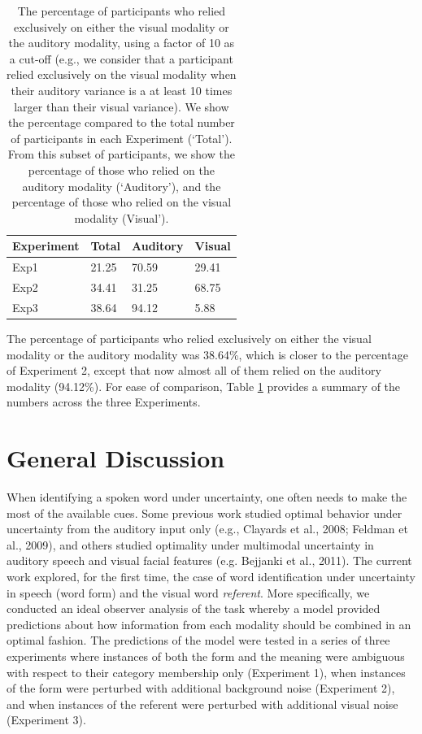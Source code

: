 \documentclass[english,floatsintext,man]{apa6}
\theoremstyle{definition}
\theoremstyle{definition}
\theoremstyle{definition}
\theoremstyle{remark}
\begin{document}
\begin{table}[tbp]
\begin{center}
\begin{threeparttable}
\caption{\label{tab:exclusive}The percentage of participants who relied exclusively on either the visual modality or the auditory modality, using a factor of 10 as a cut-off (e.g., we consider that a participant relied exclusively on the visual modality when their auditory variance is a at least 10 times larger than their visual variance). We show the percentage compared to the total number of participants in each Experiment (`Total'). From this subset of participants, we show the percentage of those who relied on the  auditory modality (`Auditory'), and the percentage of those who relied on the visual  modality (Visual').}
\begin{tabular}{llll}
\toprule
Experiment & \multicolumn{1}{c}{Total} & \multicolumn{1}{c}{Auditory} & \multicolumn{1}{c}{Visual}\\
\midrule
Exp1 & 21.25 & 70.59 & 29.41\\
Exp2 & 34.41 & 31.25 & 68.75\\
Exp3 & 38.64 & 94.12 & 5.88\\
\bottomrule
\end{tabular}
\end{threeparttable}
\end{center}
\end{table}

The percentage of participants who relied exclusively on either the
visual modality or the auditory modality was 38.64\%, which is closer to
the percentage of Experiment 2, except that now almost all of them
relied on the auditory modality (94.12\%). For ease of comparison, Table
\ref{tab:exclusive} provides a summary of the numbers across the three
Experiments.

\section{General Discussion}\label{general-discussion}

When identifying a spoken word under uncertainty, one often needs to
make the most of the available cues. Some previous work studied optimal
behavior under uncertainty from the auditory input only (e.g., Clayards
et al., 2008; Feldman et al., 2009), and others studied optimality under
multimodal uncertainty in auditory speech and visual facial features
(e.g. Bejjanki et al., 2011). The current work explored, for the first
time, the case of word identification under uncertainty in speech (word
form) and the visual word \emph{referent}. More specifically, we
conducted an ideal observer analysis of the task whereby a model
provided predictions about how information from each modality should be
combined in an optimal fashion. The predictions of the model were tested
in a series of three experiments where instances of both the form and
the meaning were ambiguous with respect to their category membership
only (Experiment 1), when instances of the form were perturbed with
additional background noise (Experiment 2), and when instances of the
referent were perturbed with additional visual noise (Experiment 3).
\end{document}
